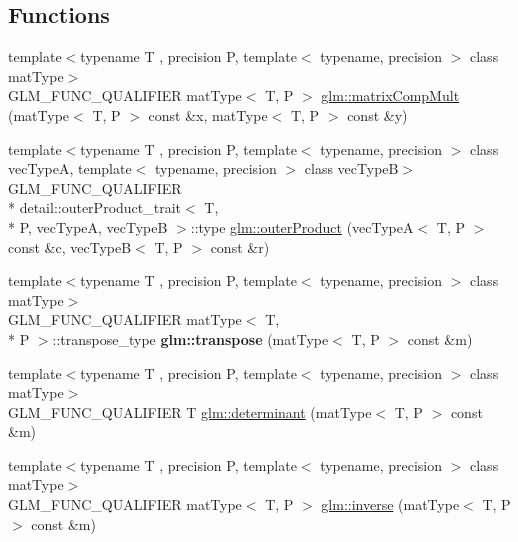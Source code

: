 \subsection*{Functions}
\begin{DoxyCompactItemize}
\item 
{\footnotesize template$<$typename T , precision P, template$<$ typename, precision $>$ class mat\-Type$>$ }\\G\-L\-M\-\_\-\-F\-U\-N\-C\-\_\-\-Q\-U\-A\-L\-I\-F\-I\-E\-R mat\-Type$<$ T, P $>$ \hyperlink{group__core__func__matrix_ga4a54992e4741188ee624b21e3ba91814}{glm\-::matrix\-Comp\-Mult} (mat\-Type$<$ T, P $>$ const \&x, mat\-Type$<$ T, P $>$ const \&y)
\item 
{\footnotesize template$<$typename T , precision P, template$<$ typename, precision $>$ class vec\-Type\-A, template$<$ typename, precision $>$ class vec\-Type\-B$>$ }\\G\-L\-M\-\_\-\-F\-U\-N\-C\-\_\-\-Q\-U\-A\-L\-I\-F\-I\-E\-R \\*
detail\-::outer\-Product\-\_\-trait$<$ T, \\*
P, vec\-Type\-A, vec\-Type\-B $>$\-::type \hyperlink{group__core__func__matrix_gae9f513dc8e4f3ceb993669321b6d0f09}{glm\-::outer\-Product} (vec\-Type\-A$<$ T, P $>$ const \&c, vec\-Type\-B$<$ T, P $>$ const \&r)
\item 
\hypertarget{namespaceglm_a44eaf0309b3d7a9e71e31b5d4a8dbaab}{{\footnotesize template$<$typename T , precision P, template$<$ typename, precision $>$ class mat\-Type$>$ }\\G\-L\-M\-\_\-\-F\-U\-N\-C\-\_\-\-Q\-U\-A\-L\-I\-F\-I\-E\-R mat\-Type$<$ T, \\*
P $>$\-::transpose\-\_\-type {\bfseries glm\-::transpose} (mat\-Type$<$ T, P $>$ const \&m)}\label{namespaceglm_a44eaf0309b3d7a9e71e31b5d4a8dbaab}

\item 
{\footnotesize template$<$typename T , precision P, template$<$ typename, precision $>$ class mat\-Type$>$ }\\G\-L\-M\-\_\-\-F\-U\-N\-C\-\_\-\-Q\-U\-A\-L\-I\-F\-I\-E\-R T \hyperlink{group__core__func__matrix_ga26ea77c574802bc6fc193c40478718d2}{glm\-::determinant} (mat\-Type$<$ T, P $>$ const \&m)
\item 
{\footnotesize template$<$typename T , precision P, template$<$ typename, precision $>$ class mat\-Type$>$ }\\G\-L\-M\-\_\-\-F\-U\-N\-C\-\_\-\-Q\-U\-A\-L\-I\-F\-I\-E\-R mat\-Type$<$ T, P $>$ \hyperlink{group__core__func__matrix_ga7635d3dbe5aa10ff73a0e6903bf6bea5}{glm\-::inverse} (mat\-Type$<$ T, P $>$ const \&m)
\end{DoxyCompactItemize}



